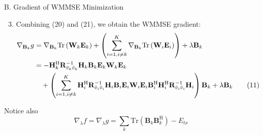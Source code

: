 \documentclass[aspectratio=169, 10pt]{beamer}
\begin{document}
\begin{frame}{B. Gradient of WMMSE Minimization}
    \begin{enumerate}
        \setcounter{enumi}{2}
        \item Combining (20) and (21), we obtain the WMMSE gradient:
              \vspace{2ex}
              \begin{align}
                  \nabla_{\mathbf{B}_k} g
                   & =
                  \nabla_{\mathbf{B}_k}\mathrm{Tr}\left(\mathbf{W}_k \mathbf{E}_k\right)
                  + \left(
                  \sum_{i=1,i\ne k}^K
                  \nabla_{\mathbf{B}_k}\mathrm{Tr}\left(\mathbf{W}_i \mathbf{E}_i\right)\right) + \lambda \mathbf{B}_k \notag                            \\
                   & = -\mathbf{H}_k^\mathrm{H} \mathbf{R}_{\tilde{v}_k\tilde{v}_k}^{-1} \mathbf{H}_k \mathbf{B}_k \mathbf{E}_k\mathbf{W}_k \mathbf{E}_k
                  \notag                                                                                                                                 \\& \quad
                  + \left(
                  \sum_{i=1,i\ne k}^K \mathbf{H}_i^\mathrm{H} \mathbf{R}_{\tilde{v}_i\tilde{v}_i}^{-1} \mathbf{H}_i \mathbf{B}_i \mathbf{E}_i\mathbf{W}_i\mathbf{E}_i
                  \mathbf{B}_i^\mathrm{H}
                  \mathbf{H}_i^\mathrm{H} \mathbf{R}_{\tilde{v}_i\tilde{v}_i}^{-1} \mathbf{H}_i
                  \right)\mathbf{B}_k
                  + \lambda \mathbf{B}_k \tag{11}
              \end{align}
    \end{enumerate}
    Notice also
    \begin{equation*}
        \nabla_\lambda f = \nabla_\lambda g = \sum_k \mathrm{Tr}\left(\mathbf{B}_k \mathbf{B}_k^\mathrm{H}\right) - E_{tx}
    \end{equation*}
\end{frame}
\end{document}
